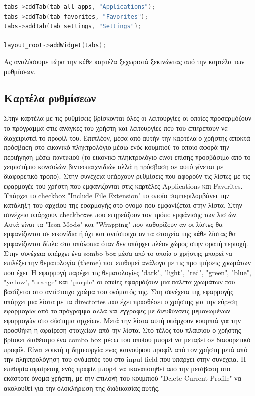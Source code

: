 \begin{lstlisting}[language=C++, style=cppstyle]
tabs->addTab(tab_all_apps, "Applications");
tabs->addTab(tab_favorites, "Favorites");
tabs->addTab(tab_settings, "Settings");

layout_root->addWidget(tabs);
\end{lstlisting}

Ας αναλύσουμε τώρα την κάθε καρτέλα ξεχωριστά ξεκινώντας από την καρτέλα των ρυθμίσεων.


\subsection{Καρτέλα ρυθμίσεων}

Στην καρτέλα με τις ρυθμίσεις βρίσκονται όλες οι λειτουργίες οι οποίες προσαρμόζουν το
πρόγραμμα στις ανάγκες του χρήστη και λειτουργίες που του επιτρέπουν να διαχειριστεί το
προφίλ του. Επιπλέον, μέσα από αυτήν την καρτέλα ο χρήστης αποκτά πρόσβαση στο εικονικό
πληκτρολόγιο μέσω ενός κουμπιού το οποίο αφορά την περιήγηση μέσω ποντικιού (το εικονικό
πληκτρολόγιο είναι επίσης προσβάσιμο από το χειριστήριο κονσολών βιντεοπαιχνιδιών αλλά η
πρόσβαση σε αυτό γίνεται με διαφορετικό τρόπο). Στην συνέχεια υπάρχουν ρυθμίσεις που αφορούν
τις λίστες με τις εφαρμογές του χρήστη που εμφανίζονται στις καρτέλες Applications και 
Favorites. Υπάρχει το checkbox "Include File Extension" το οποίο συμπεριλαμβάνει την κατάληξη
του αρχείου της εφαρμογής στο όνομα που εμφανίζεται στην λίστα. Στην συνέχεια υπάρχουν
checkboxes που επηρεάζουν τον τρόπο εμφάνισης των λιστών. Αυτά είναι τα "Icon Mode" και
"Wrapping" που καθορίζουν αν οι λίστες θα εμφανίζονται σε εικονίδια ή όχι και αντίστοιχα αν τα στοιχεία
της κάθε λίστας θα εμφανίζονται δίπλα στα υπόλοιπα όταν δεν υπάρχει πλέον χώρος στην ορατή περιοχή.
Στην συνέχεια υπάρχει ένα combo box μέσα από το οποίο ο χρήστης μπορεί να επιλέξει την
θεματολογία (theme) που επιθυμεί ανάλογα με τις προτιμήσεις χρωμάτων που έχει. Η εφαρμογή παρέχει τις
θεματολογίες "dark", "light", "red", "green", "blue", "yellow", "orange" και "purple" οι οποίες
εφαρμόζουν μια παλέτα χρωμάτων που βασίζεται στο αντίστοιχο χρώμα του ονόματός της.  Στη συνέχεια
της εφαρμογής υπάρχει μια λίστα με τα directories που έχει προσθέσει ο χρήστης για την εύρεση εφαρμογών 
από το πρόγραμμα αλλά και εγγραφές με διευθύνσεις μεμονωμένων εφαρμογών στο σύστημα αρχείων.
Μετά την λίστα αυτή υπάρχουν κουμπιά για την προσθήκη η αφαίρεση στοιχείων από την λίστα.
Στο τέλος του πλαισίου ο χρήστης βρίσκει διαθέσιμο ένα combo box μέσω του οποίου μπορεί να μεταβεί σε διαφορετικό προφίλ.
Είναι εφικτή η δημιουργία ενός καινούριου προφίλ από τον χρήστη μετά από την πληκτρολόγηση του
ονόματός του στο input field που υπάρχει στην συνέχεια. Η επιθυμία αφαίρεσης ενός προφίλ μπορεί να
ικανοποιηθεί από την μετάβαση στο εκάστοτε όνομα χρήστη, με την επιλογή του κουμπιού
"Delete Current Profile" να ακολουθεί για την ολοκλήρωση της διαδικασίας αυτής.


